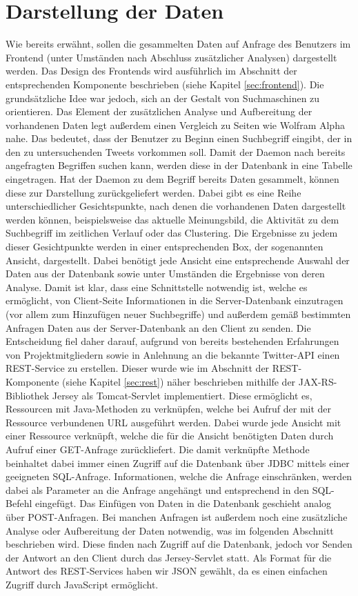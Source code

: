 \section{Darstellung der Daten}
\label{sec:architekturDarstellung}

Wie bereits erwähnt, sollen die gesammelten Daten auf Anfrage des Benutzers im Frontend (unter Umständen nach Abschluss zusätzlicher Analysen) dargestellt werden. Das Design des Frontends wird ausführlich im Abschnitt der entsprechenden Komponente beschrieben (siehe Kapitel \ref{sec:frontend}). Die grundsätzliche Idee war jedoch, sich an der Gestalt von Suchmaschinen zu orientieren. Das Element der zusätzlichen Analyse und Aufbereitung der vorhandenen Daten legt außerdem einen Vergleich zu Seiten wie Wolfram Alpha nahe. Das bedeutet, dass der Benutzer zu Beginn einen Suchbegriff eingibt, der in den zu untersuchenden Tweets vorkommen soll. Damit der Daemon nach bereits angefragten Begriffen suchen kann, werden diese in der Datenbank in eine Tabelle eingetragen. Hat der Daemon zu dem Begriff bereits Daten gesammelt, können diese zur Darstellung zurückgeliefert werden. Dabei gibt es eine Reihe unterschiedlicher Gesichtspunkte, nach denen die vorhandenen Daten dargestellt werden können, beispielsweise das aktuelle Meinungsbild, die Aktivität zu dem Suchbegriff im zeitlichen Verlauf oder das Clustering. Die Ergebnisse zu jedem dieser Gesichtpunkte werden in einer entsprechenden Box, der sogenannten Ansicht, dargestellt. Dabei benötigt jede Ansicht eine entsprechende Auswahl der Daten aus der Datenbank sowie unter Umständen die Ergebnisse von deren Analyse. Damit ist klar, dass eine Schnittstelle notwendig ist, welche es ermöglicht, von Client-Seite Informationen in die Server-Datenbank einzutragen (vor allem zum Hinzufügen neuer Suchbegriffe) und außerdem gemäß bestimmten Anfragen Daten aus der Server-Datenbank an den Client zu senden. Die Entscheidung fiel daher darauf, aufgrund von bereits bestehenden Erfahrungen von Projektmitgliedern sowie in Anlehnung an die bekannte Twitter-API einen REST-Service zu erstellen. Dieser wurde wie im Abschnitt der REST-Komponente (siehe Kapitel \ref{sec:rest}) näher beschrieben mithilfe der JAX-RS-Bibliothek Jersey als Tomcat-Servlet implementiert. Diese ermöglicht es, Ressourcen mit Java-Methoden zu verknüpfen, welche bei Aufruf der mit der Ressource verbundenen URL ausgeführt werden. Dabei wurde jede Ansicht mit einer Ressource verknüpft, welche die für die Ansicht benötigten Daten durch Aufruf einer GET-Anfrage zurückliefert. Die damit verknüpfte Methode beinhaltet dabei immer einen Zugriff auf die Datenbank über JDBC mittels einer geeigneten SQL-Anfrage. Informationen, welche die Anfrage einschränken, werden dabei als Parameter an die Anfrage angehängt und entsprechend in den SQL-Befehl eingefügt. Das Einfügen von Daten in die Datenbank geschieht analog über POST-Anfragen. Bei manchen Anfragen ist außerdem noch eine zusätzliche Analyse oder Aufbereitung der Daten notwendig, was im folgenden Abschnitt beschrieben wird. Diese finden nach Zugriff auf die Datenbank, jedoch vor Senden der Antwort an den Client durch das Jersey-Servlet statt. Als Format für die Antwort des REST-Services haben wir JSON gewählt, da es einen einfachen Zugriff durch JavaScript ermöglicht.


